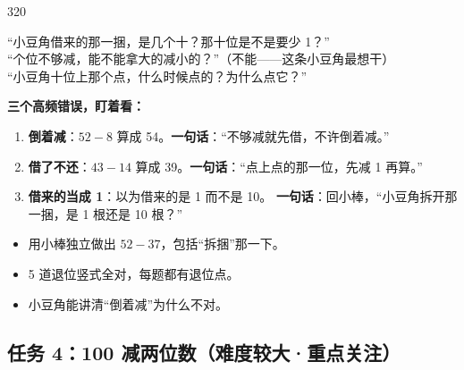\begin{lesson}{3}{20}
\begin{saybox}
“小豆角借来的那一捆，是几个十？那十位是不是要少 1？”\\
“个位不够减，能不能拿大的减小的？”（不能——这条小豆角最想干）\\
“小豆角十位上那个点，什么时候点的？为什么点它？”
\end{saybox}

\begin{pitbox}
\textbf{三个高频错误，盯着看：}
\begin{enumerate}[label=\arabic*、]
  \item \textbf{倒着减}：$52-8$ 算成 54。\textbf{一句话}：“不够减就先借，不许倒着减。”
  \item \textbf{借了不还}：$43-14$ 算成 39。\textbf{一句话}：“点上点的那一位，先减 1 再算。”
  \item \textbf{借来的当成 1}：以为借来的是 1 而不是 10。
        \textbf{一句话}：回小棒，“小豆角拆开那一捆，是 1 根还是 10 根？”
\end{enumerate}
\end{pitbox}

\begin{passbox}
\begin{itemize}
  \item 用小棒独立做出 $52-37$，包括“拆捆”那一下。
  \item 5 道退位竖式全对，每题都有退位点。
  \item 小豆角能讲清“倒着减”为什么不对。
\end{itemize}
\end{passbox}
\end{lesson}

\subsection{任务 4：100 减两位数（难度较大·重点关注）}

